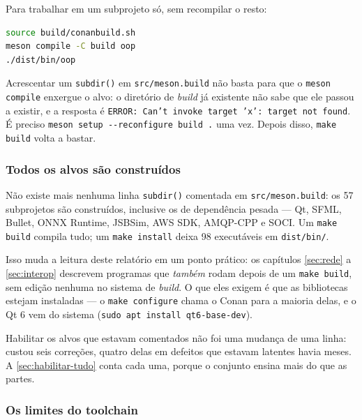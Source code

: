 Para trabalhar em um subprojeto só, sem recompilar o resto:

\begin{lstlisting}[style=bt, language=bash,
    caption={O ciclo de edição de um subprojeto.}]
source build/conanbuild.sh
meson compile -C build oop
./dist/bin/oop
\end{lstlisting}

\begin{armadilha}
Acrescentar um \texttt{subdir()} em \texttt{src/meson.build} não basta para que
o \texttt{meson compile} enxergue o alvo: o diretório de \emph{build} já
existente não sabe que ele passou a existir, e a resposta é
\texttt{ERROR: Can't invoke target 'x': target not found}. É preciso
\texttt{meson setup -{}-reconfigure build .} uma vez. Depois disso, \texttt{make
build} volta a bastar.
\end{armadilha}

\subsubsection{Todos os alvos são construídos}
\label{sec:sem-alvos-comentados}

Não existe mais nenhuma linha \texttt{subdir()} comentada em
\texttt{src/meson.build}: os 57 subprojetos são construídos, inclusive os de
dependência pesada --- Qt, SFML, Bullet, ONNX Runtime, JSBSim, AWS SDK,
AMQP-CPP e SOCI. Um \texttt{make build} compila tudo; um \texttt{make install}
deixa 98 executáveis em \texttt{dist/bin/}.

Isso muda a leitura deste relatório em um ponto prático: os capítulos
\ref{sec:rede} a \ref{sec:interop} descrevem programas que \emph{também} rodam
depois de um \texttt{make build}, sem edição nenhuma no sistema de
\emph{build}. O que eles exigem é que as bibliotecas estejam instaladas ---
o \texttt{make configure} chama o Conan para a maioria delas, e o Qt 6 vem do
sistema (\texttt{sudo apt install qt6-base-dev}).

Habilitar os alvos que estavam comentados não foi uma mudança de uma linha:
custou seis correções, quatro delas em defeitos que estavam latentes havia
meses. A \cref{sec:habilitar-tudo} conta cada uma, porque o conjunto ensina
mais do que as partes.

\subsubsection{Os limites do toolchain}

